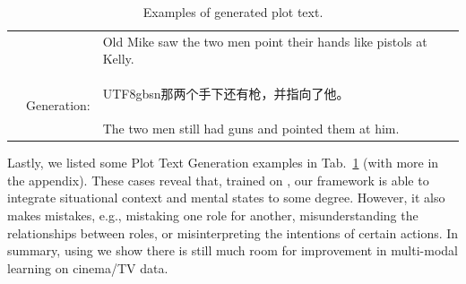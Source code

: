 \begin{table}[t]
\begin{tabular}{cll}
 & & Old Mike saw the two men point their hands like pistols at Kelly. \\
 & \multirow{2}{*}{Generation:} & \begin{CJK*}{UTF8}{gbsn}那两个手下还有枪，并指向了他。\end{CJK*} \\
 & & The two men still had guns and pointed them at him. \\
\bottomrule
\end{tabular}
\caption{\label{tab:plot_generation_case}
Examples of generated plot text.
}
\vspace{-0.2in}
\end{table}
 
Lastly, we listed some Plot Text Generation examples in Tab.~\ref{tab:plot_generation_case} (with more in the appendix).
These cases reveal that, trained on \TVD, our framework is able to integrate situational context and mental states to some degree. 
However, it also makes mistakes, e.g., mistaking one role for another,  misunderstanding the relationships between roles, or misinterpreting the intentions of certain actions. 
In summary, using \TVD we show there is still much room for improvement in multi-modal learning on cinema/TV data.